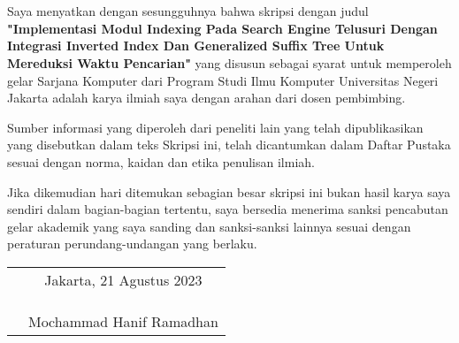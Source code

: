 \chapter*{}
\onehalfspacing{}

Saya menyatkan dengan sesungguhnya bahwa skripsi dengan judul
\textbf{"Implementasi Modul Indexing Pada Search Engine Telusuri Dengan
Integrasi Inverted Index Dan Generalized Suffix Tree Untuk Mereduksi Waktu
Pencarian"} yang disusun sebagai syarat untuk memperoleh gelar Sarjana Komputer
dari Program Studi Ilmu Komputer Universitas Negeri Jakarta adalah karya ilmiah
saya dengan arahan dari dosen pembimbing.

Sumber informasi yang diperoleh dari peneliti lain yang telah dipublikasikan 
yang disebutkan dalam teks Skripsi ini, telah dicantumkan dalam Daftar Pustaka 
sesuai dengan norma, kaidan dan etika penulisan ilmiah.

Jika dikemudian hari ditemukan sebagian besar skripsi ini bukan hasil karya saya 
sendiri dalam bagian-bagian tertentu, saya bersedia menerima sanksi pencabutan 
gelar akademik yang saya sanding dan sanksi-sanksi lainnya sesuai dengan 
peraturan perundang-undangan yang berlaku.

\vspace{4cm}

\begin{tabular}{p{7.5cm}c}
	&Jakarta, 21 Agustus 2023\\
	&\\
	&\\
	&\\
	&Mochammad Hanif Ramadhan
\end{tabular}

